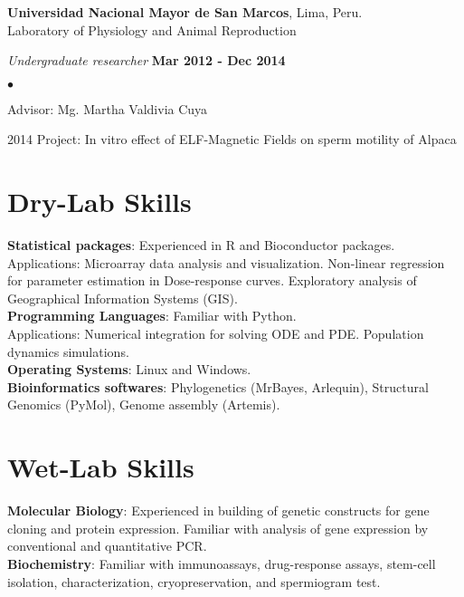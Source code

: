 \documentclass[margin,line]{res}
\newenvironment{list1}{
  \begin{list}{\ding{113}}{%
      \setlength{\itemsep}{0in}
      \setlength{\parsep}{0in} \setlength{\parskip}{0in}
      \setlength{\topsep}{0in} \setlength{\partopsep}{0in}
      \setlength{\leftmargin}{0.17in}}}{\end{list}}
\newenvironment{list2}{
  \begin{list}{$\bullet$}{%
      \setlength{\itemsep}{0in}
      \setlength{\parsep}{0in} \setlength{\parskip}{0in}
      \setlength{\topsep}{0in} \setlength{\partopsep}{0in}
      \setlength{\leftmargin}{0.2in}}}{\end{list}}
\begin{document}
\begin{resume}
{\bf Universidad Nacional Mayor de San Marcos}, Lima, Peru.\\
Laboratory of Physiology and Animal Reproduction\\
\vspace*{-.1in}
\begin{list1}
	\item[] {\em Undergraduate researcher} \hfill {\bf Mar 2012 - Dec 2014}\\
	\vspace*{-.1in}
	\begin{list2} %
		\item Advisor: Mg. Martha Valdivia Cuya
		\item 2014 Project: In vitro effect of ELF-Magnetic Fields on sperm motility of Alpaca\\
	\end{list2}
\end{list1}

\section{\sc Dry-Lab Skills}
{\bf Statistical packages}: Experienced in R and Bioconductor packages.\\
Applications: Microarray data analysis and visualization. Non-linear regression for parameter estimation in Dose-response curves. Exploratory analysis of Geographical Information Systems (GIS).\\
{\bf Programming Languages}: Familiar with Python.\\
Applications: Numerical integration for solving ODE and PDE. Population dynamics simulations.\\
{\bf Operating Systems}: Linux and Windows.\\
{\bf Bioinformatics softwares}: Phylogenetics (MrBayes, Arlequin), Structural Genomics (PyMol), Genome assembly (Artemis).

\section{\sc Wet-Lab Skills}
{\bf Molecular Biology}: Experienced in building of genetic constructs for gene cloning and protein expression. Familiar with analysis of gene expression by conventional and quantitative PCR.\\
{\bf Biochemistry}: Familiar with immunoassays, drug-response assays, stem-cell isolation, characterization, cryopreservation, and spermiogram test.\\


\end{resume}
\end{document}

